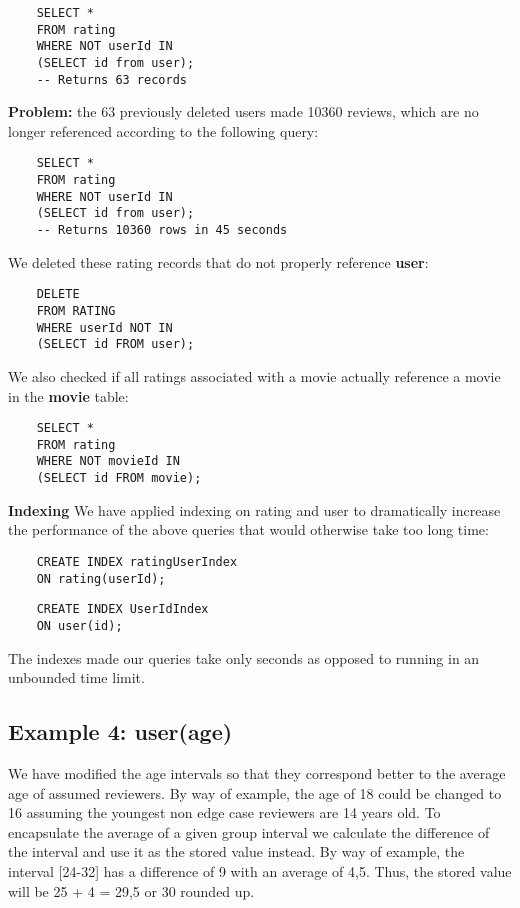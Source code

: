 \begin{verbatim}
	SELECT * 
	FROM rating
	WHERE NOT userId IN 
	(SELECT id from user); 
	-- Returns 63 records 
\end{verbatim}

\newpage

\noindent \textbf{Problem:} the 63 previously deleted users made 10360 reviews, which are no longer referenced according to the following query: 

\begin{verbatim}
	SELECT * 
	FROM rating
	WHERE NOT userId IN 
	(SELECT id from user); 
	-- Returns 10360 rows in 45 seconds 
\end{verbatim}

\noindent We deleted these rating records that do not properly reference \textbf{user}: 

\begin{verbatim}
	DELETE 
	FROM RATING 
	WHERE userId NOT IN 
	(SELECT id FROM user);
\end{verbatim}

\noindent We also checked if all ratings associated with a movie actually reference a movie in the \textbf{movie} table: 

\begin{verbatim}
	SELECT * 
	FROM rating
	WHERE NOT movieId IN
	(SELECT id FROM movie); 
\end{verbatim}

\noindent \textbf{Indexing}
We have applied indexing on rating and user to dramatically increase the performance of the above queries that would otherwise take too long time:

\begin{verbatim}
	CREATE INDEX ratingUserIndex 
	ON rating(userId);
\end{verbatim}

\begin{verbatim}
	CREATE INDEX UserIdIndex 
	ON user(id); 
\end{verbatim}

\noindent The indexes made our queries take only seconds as opposed to running in an unbounded time limit. 

\subsection{Example 4: user(age)}
We have modified the age intervals so that they correspond better to the average age of assumed reviewers. By way of example, the age of 18 could be changed to 16 assuming the youngest non edge case reviewers are 14 years old. To encapsulate the average of a given group interval we calculate the difference of the interval and use it as the stored value instead. By way of example, the interval [24-32] has a difference of 9 with an average of 4,5. Thus, the stored value will be 25 + 4 = 29,5 or 30 rounded up. 

